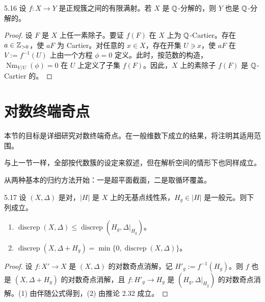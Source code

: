 
\begin{lemmap}{5.16}
设 $f\colon X\to Y$ 是正规簇之间的有限满射。若 $X$ 是 $\mathbb{Q}$-分解的，则 $Y$ 也是 $\mathbb{Q}$-分解的。
\end{lemmap}

\begin{proof}
设 $F$ 是 $X$ 上任一素除子。要证 $f(F)$ 在 $X$ 上为 $\mathbb{Q}$-Cartier。存在 $a\in\mathbb{Z}_{>0}$，使 $aF$ 为 Cartier。对任意的 $x\in X$，存在开集 $U\ni x$，使 $aF$ 在 $V:=f^{-1}(U)$ 上由一个方程 $\phi=0$ 定义。此时，按范数的构造，$\operatorname{Nm}_{V/U}(\phi)=0$ 在 $U$ 上定义了子集 $f(F)$。因此，$X$ 上的素除子 $f(F)$ 是 $\mathbb{Q}$-Cartier 的。
\end{proof}


\section{对数终端奇点}

本节的目标是详细研究对数终端奇点。在一般维数下成立的结果，将注明其适用范围。

与上一节一样，全部按代数簇的设定来叙述，但在解析空间的情形下也同样成立。

从两种基本的归约方法开始：一是超平面截面，二是取循环覆盖。

\begin{lemmap}{5.17}
设 $(X,\Delta)$ 是对，$|H|$ 是 $X$ 上的无基点线性系，$H_g\in|H|$ 是一般元。则下列成立。
\begin{enumerate}[label=(\arabic*),leftmargin=*]
\item $\operatorname{discrep}(X,\Delta)\le\operatorname{discrep}(H_g,\Delta|_{H_g})$。
\item $\operatorname{discrep}(X,\Delta+H_g)=\min\{0,\operatorname{discrep}(X,\Delta)\}$。
\end{enumerate}
\end{lemmap}

\begin{proof}
设 $f\colon X'\to X$ 是 $(X,\Delta)$ 的对数奇点消解，记 $H'_g:=f^{-1}(H_g)$。则 $f$ 也是 $(X,\Delta+H_g)$ 的对数奇点消解，且 $f\colon H'_g\to H_g$ 是 $(H_g,\Delta|_{H_g})$ 的对数奇点消解。(1) 由伴随公式得到，(2) 由推论 2.32 成立。
\end{proof}


